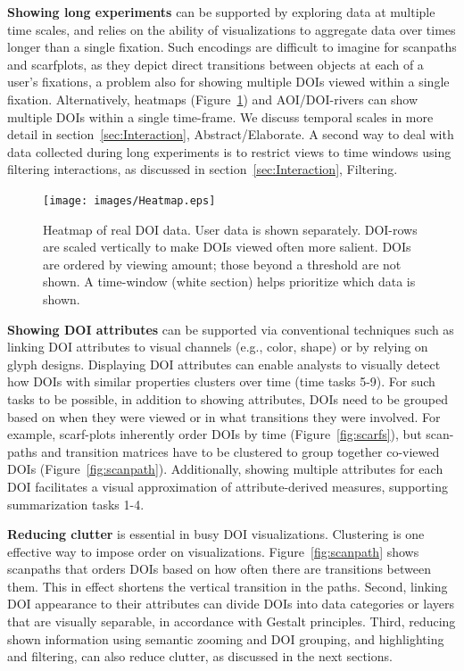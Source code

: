 \noindent \textbf{Showing long experiments} can be supported by exploring data at multiple time scales, and relies on the ability of visualizations to aggregate data over times longer than a single fixation. Such encodings are difficult to imagine for scanpaths and scarfplots, as they depict direct transitions between objects at each of a user's fixations, a problem also for showing multiple DOIs viewed within a single fixation. Alternatively, heatmaps (Figure~\ref{fig:heatmap}) and AOI/DOI-rivers can show multiple DOIs within a single time-frame. We discuss temporal scales in more detail in section~\ref{sec:Interaction}, Abstract/Elaborate. A second way to deal with data collected during long experiments is to restrict views to time windows using filtering interactions, as discussed in section~\ref{sec:Interaction}, Filtering.

\begin{figure}[htb]
  \centering
	\texttt{[image: images/Heatmap.eps]}
  \caption{Heatmap of real DOI data. User data is shown separately. DOI-rows are scaled vertically to make DOIs viewed often more salient. DOIs are ordered by viewing amount; those beyond a threshold are not shown.
  A time-window (white section) helps prioritize which data is shown.}
	\label{fig:heatmap}
\end{figure}


\noindent \textbf{Showing DOI attributes} can be supported via conventional techniques such as linking DOI attributes to visual channels (e.g., color, shape) or by relying on glyph designs. Displaying DOI attributes can enable analysts to visually detect how DOIs with similar properties clusters over time (time tasks 5-9). For such tasks to be possible, in addition to showing attributes, DOIs need to be grouped based on when they were viewed or in what transitions they were involved. For example, scarf-plots inherently order DOIs by time (Figure~\ref{fig:scarfs}), but scan-paths and transition matrices have to be clustered to group together co-viewed DOIs (Figure~\ref{fig:scanpath}). Additionally, showing multiple attributes for each DOI facilitates a visual approximation of attribute-derived measures, supporting summarization tasks 1-4. 

\noindent \textbf{Reducing clutter} is essential in busy DOI visualizations. Clustering is one effective way to impose order on visualizations. Figure~\ref{fig:scanpath} shows scanpaths that orders DOIs based on how often there are transitions between them. This in effect shortens the vertical transition in the paths. Second, linking DOI appearance to their attributes can divide DOIs into data categories or layers that are visually separable, in accordance with Gestalt principles. Third, reducing shown information using semantic zooming and DOI grouping, and highlighting and filtering, can also reduce clutter, as discussed in the next sections. 

